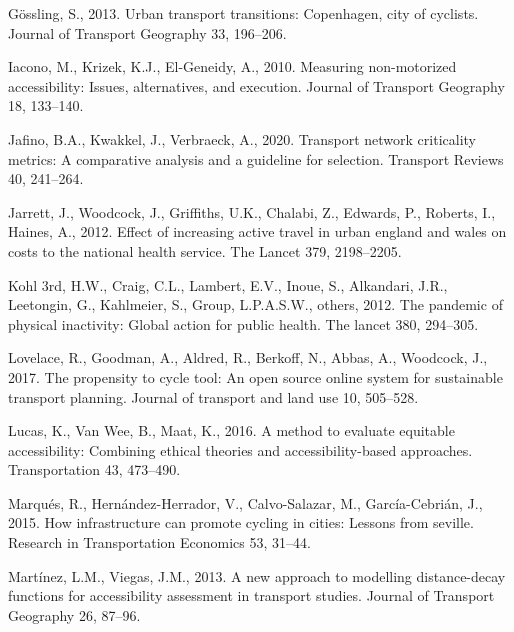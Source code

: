 \documentclass[
]{article}
\newlength{\cslhangindent}
\newlength{\cslentryspacingunit} %
\newenvironment{CSLReferences}[2] %
 {%
  \setlength{\parindent}{0pt}
  \ifodd #1
  \let\oldpar\par
  \def\par{\hangindent=\cslhangindent\oldpar}
  \fi
  \setlength{\parskip}{#2\cslentryspacingunit}
 }%
 {}
\begin{document}
\begin{CSLReferences}{1}{0}
\leavevmode{}%
Gössling, S., 2013. Urban transport transitions: Copenhagen, city of cyclists. Journal of Transport Geography 33, 196--206.

\leavevmode{}%
Iacono, M., Krizek, K.J., El-Geneidy, A., 2010. Measuring non-motorized accessibility: Issues, alternatives, and execution. Journal of Transport Geography 18, 133--140.

\leavevmode{}%
Jafino, B.A., Kwakkel, J., Verbraeck, A., 2020. Transport network criticality metrics: A comparative analysis and a guideline for selection. Transport Reviews 40, 241--264.

\leavevmode{}%
Jarrett, J., Woodcock, J., Griffiths, U.K., Chalabi, Z., Edwards, P., Roberts, I., Haines, A., 2012. Effect of increasing active travel in urban england and wales on costs to the national health service. The Lancet 379, 2198--2205.

\leavevmode{}%
Kohl 3rd, H.W., Craig, C.L., Lambert, E.V., Inoue, S., Alkandari, J.R., Leetongin, G., Kahlmeier, S., Group, L.P.A.S.W., others, 2012. The pandemic of physical inactivity: Global action for public health. The lancet 380, 294--305.

\leavevmode{}%
Lovelace, R., Goodman, A., Aldred, R., Berkoff, N., Abbas, A., Woodcock, J., 2017. The propensity to cycle tool: An open source online system for sustainable transport planning. Journal of transport and land use 10, 505--528.

\leavevmode{}%
Lucas, K., Van Wee, B., Maat, K., 2016. A method to evaluate equitable accessibility: Combining ethical theories and accessibility-based approaches. Transportation 43, 473--490.

\leavevmode{}%
Marqués, R., Hernández-Herrador, V., Calvo-Salazar, M., García-Cebrián, J., 2015. How infrastructure can promote cycling in cities: Lessons from seville. Research in Transportation Economics 53, 31--44.

\leavevmode{}%
Martínez, L.M., Viegas, J.M., 2013. A new approach to modelling distance-decay functions for accessibility assessment in transport studies. Journal of Transport Geography 26, 87--96.


\end{CSLReferences}
\end{document}

